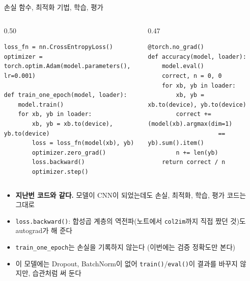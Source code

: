 \documentclass[aspectratio=169,11pt]{beamer}
\newcommand{\codesmall}{\ttfamily\fontsize{7.4}{8.3}\selectfont}
\newcommand{\code}[1]{\texttt{#1}}
\begin{document}
\begin{frame}{손실 함수, 최적화 기법, 학습, 평가}
\begin{columns}[T,onlytextwidth]
\begin{column}{0.50\textwidth}
\begin{lstlisting}[basicstyle=\codesmall]
loss_fn = nn.CrossEntropyLoss()
optimizer = torch.optim.Adam(model.parameters(), lr=0.001)

def train_one_epoch(model, loader):
    model.train()
    for xb, yb in loader:
        xb, yb = xb.to(device), yb.to(device)
        loss = loss_fn(model(xb), yb)
        optimizer.zero_grad()
        loss.backward()
        optimizer.step()
\end{lstlisting}
\end{column}
\begin{column}{0.47\textwidth}
\begin{lstlisting}[basicstyle=\codesmall]
@torch.no_grad()
def accuracy(model, loader):
    model.eval()
    correct, n = 0, 0
    for xb, yb in loader:
        xb, yb = xb.to(device), yb.to(device)
        correct += (model(xb).argmax(dim=1)
                    == yb).sum().item()
        n += len(yb)
    return correct / n
\end{lstlisting}
\end{column}
\end{columns}
\small
\begin{itemize}
\item \textbf{지난번 코드와 같다.} 모델이 CNN이 되었는데도 손실, 최적화, 학습, 평가 코드는 그대로
\item \code{loss.backward()}: 합성곱 계층의 역전파(노트에서 \code{col2im}까지 직접 짰던 것)도 autograd가 해 준다
\item \code{train\_one\_epoch}는 손실을 기록하지 않는다 (이번에는 검증 정확도만 본다)
\item 이 모델에는 Dropout, BatchNorm이 없어 \code{train()}/\code{eval()}이 결과를 바꾸지 않지만, 습관처럼 써 둔다
\end{itemize}
\end{frame}
\end{document}
